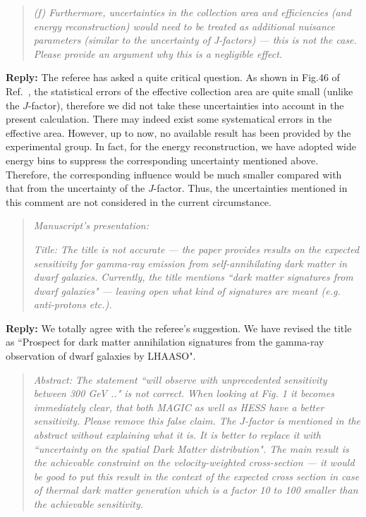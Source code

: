\documentclass{article}
\begin{document}
\begin{quote}\emph{(f) Furthermore, uncertainties in the collection area and efficiencies (and energy reconstruction) would need to be treated as additional nuisance parameters (similar to the uncertainty of J-factors) --- this is not the case. Please provide an argument why this is a negligible effect.}\end{quote}


\textbf{Reply:}
The referee has asked a quite critical question.
As shown in Fig.46 of Ref.~\cite{Bai:2019khm}, the statistical errors of the effective collection area are quite small (unlike the $J$-factor), therefore we did not take these uncertainties into account in the present calculation.
There may indeed exist some systematical errors in the effective area. However, up to now, no available result has been provided by the experimental group.
In fact, for the energy reconstruction, we have adopted wide energy bins to suppress the corresponding uncertainty mentioned above.
Therefore, the corresponding influence would be much smaller compared with that from the uncertainty of the $J$-factor. Thus, the uncertainties mentioned in this comment are not considered in the current circumstance.


\begin{quote}
\emph{Manuscript's presentation:}

\emph{Title: The title is not accurate --- the paper provides results on the expected sensitivity for gamma-ray emission from self-annihilating dark matter in dwarf galaxies. Currently, the title mentions ``dark matter signatures from dwarf galaxies" --- leaving open what kind of signatures are meant (e.g. anti-protons etc.).}
\end{quote}

\textbf{Reply:} We totally agree with the referee's suggestion. We have revised the title as ``Prospect for dark matter annihilation signatures from the gamma-ray observation of dwarf galaxies by LHAASO".

\begin{quote}
\emph{Abstract: The statement ``will observe with unprecedented sensitivity between 300 GeV .." is not correct. When looking at Fig. 1 it becomes immediately clear, that both MAGIC as well as HESS have a better sensitivity. Please remove this false claim. The $J$-factor is mentioned in the abstract without explaining what it is. It is better to replace it with ``uncertainty on the spatial Dark Matter distribution". The main result is the achievable constraint on the velocity-weighted cross-section --- it would be good to put this result in the context of the expected cross section in case of thermal dark matter generation which is a factor 10 to 100 smaller than the achievable sensitivity.}
\end{quote}
\end{document}
